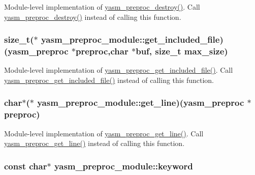 Module-\/level implementation of \hyperlink{preproc_8h_a739e2e27b78b82238ca5ed22d91fb0e2}{yasm\-\_\-preproc\-\_\-destroy()}. Call \hyperlink{preproc_8h_a739e2e27b78b82238ca5ed22d91fb0e2}{yasm\-\_\-preproc\-\_\-destroy()} instead of calling this function. \hypertarget{structyasm__preproc__module_aca1a9fb2898e43d42e9e130fa95327a2}{
\subsubsection[{get\-\_\-included\-\_\-file}]{\setlength{\rightskip}{0pt plus 5cm}size\-\_\-t($\ast$ yasm\-\_\-preproc\-\_\-module\-::get\-\_\-included\-\_\-file)({\bf yasm\-\_\-preproc} $\ast$preproc,char $\ast$buf, size\-\_\-t max\-\_\-size)}}\label{structyasm__preproc__module_aca1a9fb2898e43d42e9e130fa95327a2}
Module-\/level implementation of \hyperlink{preproc_8h_a423085c20fc16ab6ded14d3d50174ed8}{yasm\-\_\-preproc\-\_\-get\-\_\-included\-\_\-file()}. Call \hyperlink{preproc_8h_a423085c20fc16ab6ded14d3d50174ed8}{yasm\-\_\-preproc\-\_\-get\-\_\-included\-\_\-file()} instead of calling this function. \hypertarget{structyasm__preproc__module_a90442c0082e89645360929798d9bfe80}{
\subsubsection[{get\-\_\-line}]{\setlength{\rightskip}{0pt plus 5cm}char$\ast$($\ast$ yasm\-\_\-preproc\-\_\-module\-::get\-\_\-line)({\bf yasm\-\_\-preproc} $\ast$preproc)}}\label{structyasm__preproc__module_a90442c0082e89645360929798d9bfe80}
Module-\/level implementation of \hyperlink{preproc_8h_abbedf9b9d8f282a16b9092675804a774}{yasm\-\_\-preproc\-\_\-get\-\_\-line()}. Call \hyperlink{preproc_8h_abbedf9b9d8f282a16b9092675804a774}{yasm\-\_\-preproc\-\_\-get\-\_\-line()} instead of calling this function. \hypertarget{structyasm__preproc__module_ad37fee1370d76ddbcbea80b17be3fc83}{
\subsubsection[{keyword}]{\setlength{\rightskip}{0pt plus 5cm}const char$\ast$ yasm\-\_\-preproc\-\_\-module\-::keyword}}\label{structyasm__preproc__module_ad37fee1370d76ddbcbea80b17be3fc83}
